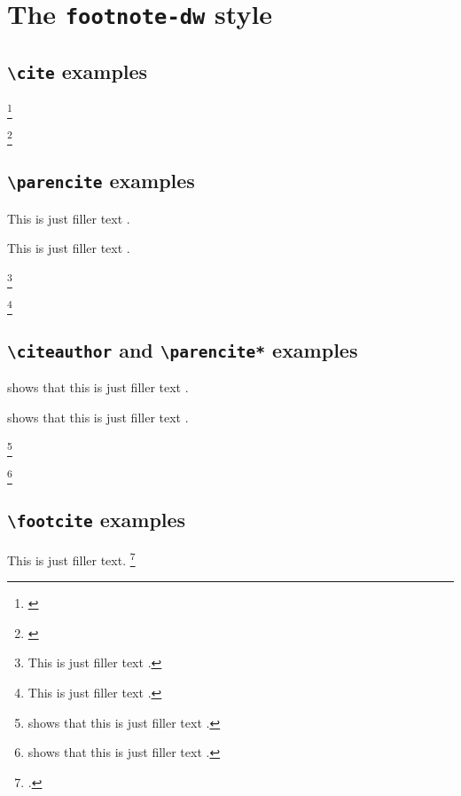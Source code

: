 \documentclass[a4paper]{article}
\newcommand{\cmd}[1]{\texttt{\textbackslash #1}}
\begin{document}
\section*{The \texttt{footnote-dw} style}

\subsection*{\cmd{cite} examples}

\cite{aristotle:rhetoric}

\cite[59]{aristotle:rhetoric}

\footnote{\cite[See][]{springer}}

\footnote{\cite[See][59--63]{springer}}

\subsection*{\cmd{parencite} examples}

This is just filler text \parencite{aristotle:rhetoric}.

This is just filler text \parencite[59]{aristotle:rhetoric}.

\footnote{This is just filler text \parencite[See][]{springer}.}

\footnote{This is just filler text \parencite[See][59--63]{springer}.}

\subsection*{\cmd{citeauthor} and \cmd{parencite*} examples}

\citeauthor{aristotle:rhetoric} shows that this is just filler
text \parencite*{aristotle:rhetoric}.

\citeauthor{aristotle:rhetoric} shows that this is just filler
text \parencite*[59]{aristotle:rhetoric}.

\footnote{\citeauthor{springer} shows that this is just filler
text \parencite*[See][]{springer}.}

\footnote{\citeauthor{springer} shows that this is just filler
text \parencite*[See][59--63]{springer}.}

\subsection*{\cmd{footcite} examples}

This is just filler text. \footcite{aristotle:rhetoric}
\end{document}
